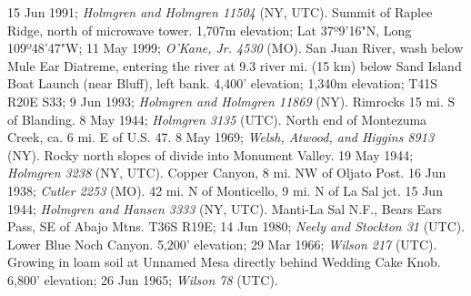 15 Jun 1991; \textit{Holmgren and Holmgren 11504} (NY, UTC).
Summit of Raplee Ridge, north of microwave tower. 1,707m elevation;
Lat 37º9'16"N, Long 109º48'47"W; 11 May 1999; \textit{O'Kane, Jr. 4530} (MO).
San Juan River, wash below Mule Ear Diatreme, entering the river at 9.3 river mi.
(15 km) below Sand Island Boat Launch (near Bluff), left bank. 4,400' elevation;
1,340m elevation; T41S R20E S33; 9 Jun 1993;
\textit{Holmgren and Holmgren 11869} (NY).
Rimrocks 15 mi. S of Blanding. 8 May 1944; \textit{Holmgren 3135} (UTC).
North end of Montezuma Creek, ca. 6 mi. E of U.S. 47. 8 May 1969;
\textit{Welsh, Atwood, and Higgins 8913} (NY).
Rocky north slopes of divide into Monument Valley. 19 May 1944;
\textit{Holmgren 3238} (NY, UTC).
Copper Canyon, 8 mi. NW of Oljato Post. 16 Jun 1938; \textit{Cutler 2253} (MO).
42 mi. N of Monticello, 9 mi. N of La Sal jct. 15 Jun 1944;
\textit{Holmgren and Hansen 3333} (NY, UTC).
Manti-La Sal N.F., Bears Ears Pass, SE of Abajo Mtns. T36S R19E; 14 Jun 1980;
\textit{Neely and Stockton 31} (UTC).
Lower Blue Noch Canyon. 5,200' elevation; 29 Mar 1966; \textit{Wilson 217} (UTC).
Growing in loam soil at Unnamed Mesa directly behind Wedding Cake Knob.
6,800' elevation; 26 Jun 1965; \textit{Wilson 78} (UTC).

